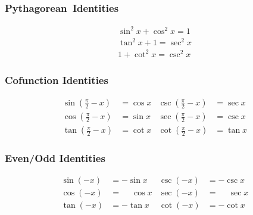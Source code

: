 \noindent%
\begin{minipage}[t]{.25\linewidth}
	\subsubsection*{Pythagorean~Identities}\vspace{-\baselineskip}
	\begin{align*}
		\sin ^2x+\cos ^2x= 1 \\
		\tan^2x+ 1 = \sec^2 x \\
		1 + \cot^2x=\csc^2 x
	\end{align*}
\end{minipage}%
\begin{minipage}[t]{.43\linewidth}
	\subsubsection*{Cofunction Identities}\vspace{-\baselineskip}
	\begin{align*}
		\sin(\tfrac{\pi}{2}-x) &= \cos x &
		\csc(\tfrac{\pi}{2}-x) &= \sec x \\
		\cos(\tfrac{\pi}{2}-x) &= \sin x &
		\sec(\tfrac{\pi}{2}-x) &= \csc x \\
		\tan(\tfrac{\pi}{2}-x) &= \cot x &
		\cot(\tfrac{\pi}{2}-x) &= \tan x
	\end{align*}
\end{minipage}%
\begin{minipage}[t]{.32\linewidth}
\subsubsection*{Even/Odd Identities}\vspace{-\baselineskip}
\begin{align*}
\sin(-x) &= -\sin x &
\csc(-x) &= -\csc x \\
\cos(-x) &= \phantom{-}\cos x &
\sec(-x) &= \phantom{-}\sec x \\
\tan(-x) &= -\tan x &
\cot(-x) &= -\cot x
\end{align*}
\end{minipage}

\vfill

